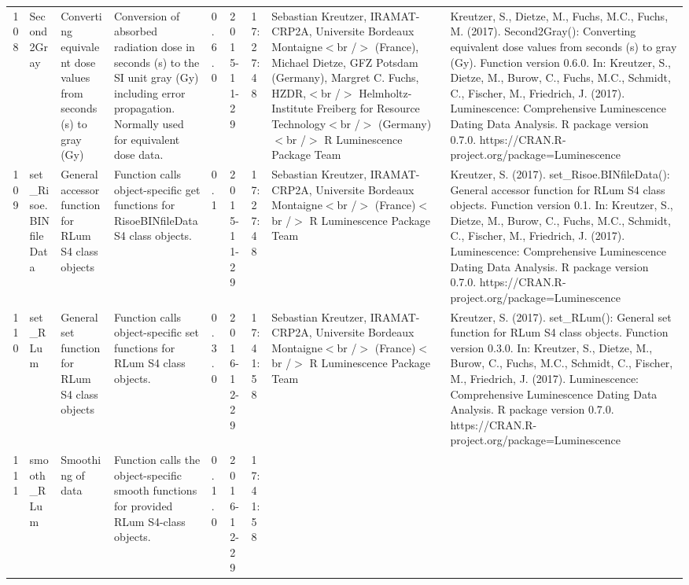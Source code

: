 \begin{table}[ht]
\begin{tabular}{rllllllll}
 \\ 
  108 & Second2Gray & Converting equivalent dose values from seconds (s) to gray (Gy) & Conversion of absorbed radiation dose in seconds (s) to the SI unit gray (Gy) including error propagation. Normally used for equivalent dose data. & 0.6.0 & 2015-11-29 & 17:27:48
 & Sebastian Kreutzer, IRAMAT-CRP2A, Universite Bordeaux Montaigne$<$br /$>$ (France),  Michael Dietze, GFZ Potsdam (Germany),  Margret C. Fuchs, HZDR,$<$br /$>$ Helmholtz-Institute Freiberg for Resource Technology$<$br /$>$ (Germany)$<$br /$>$  R Luminescence Package Team & Kreutzer, S., Dietze, M., Fuchs, M.C., Fuchs, M. (2017). Second2Gray(): Converting equivalent dose values from seconds (s) to gray (Gy). Function version 0.6.0. In: Kreutzer, S., Dietze, M., Burow, C., Fuchs, M.C., Schmidt, C., Fischer, M., Friedrich, J. (2017). Luminescence: Comprehensive Luminescence Dating Data Analysis. R package version 0.7.0. https://CRAN.R-project.org/package=Luminescence
 \\ 
  109 & set\_Risoe.BINfileData & General accessor function for RLum S4 class objects & Function calls object-specific get functions for RisoeBINfileData S4 class objects. & 0.1 & 2015-11-29 & 17:27:48
 & Sebastian Kreutzer, IRAMAT-CRP2A, Universite Bordeaux Montaigne$<$br /$>$ (France)$<$br /$>$  R Luminescence Package Team & Kreutzer, S. (2017). set\_Risoe.BINfileData(): General accessor function for RLum S4 class objects. Function version 0.1. In: Kreutzer, S., Dietze, M., Burow, C., Fuchs, M.C., Schmidt, C., Fischer, M., Friedrich, J. (2017). Luminescence: Comprehensive Luminescence Dating Data Analysis. R package version 0.7.0. https://CRAN.R-project.org/package=Luminescence
 \\ 
  110 & set\_RLum & General set function for RLum S4 class objects & Function calls object-specific set functions for RLum S4 class objects. & 0.3.0 & 2016-12-29 & 17:41:58
 & Sebastian Kreutzer, IRAMAT-CRP2A, Universite Bordeaux Montaigne$<$br /$>$ (France)$<$br /$>$  R Luminescence Package Team & Kreutzer, S. (2017). set\_RLum(): General set function for RLum S4 class objects. Function version 0.3.0. In: Kreutzer, S., Dietze, M., Burow, C., Fuchs, M.C., Schmidt, C., Fischer, M., Friedrich, J. (2017). Luminescence: Comprehensive Luminescence Dating Data Analysis. R package version 0.7.0. https://CRAN.R-project.org/package=Luminescence
 \\ 
  111 & smooth\_RLum & Smoothing of data & Function calls the object-specific smooth functions for provided RLum S4-class objects. & 0.1.0 & 2016-12-29 & 17:41:58

\end{tabular}
\end{table}
